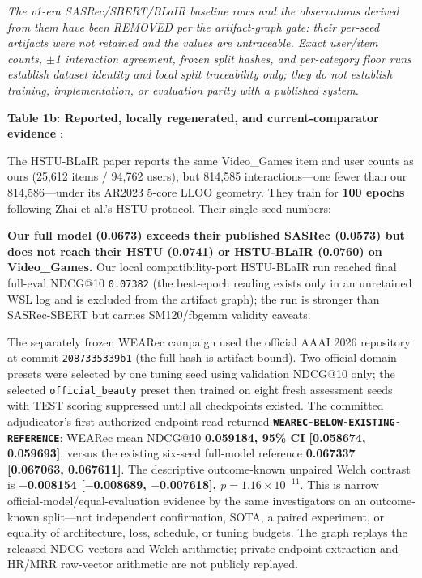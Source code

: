 

\emph{The v1-era SASRec/SBERT/BLaIR baseline rows and the observations derived from them have been REMOVED per the artifact-graph gate: their per-seed artifacts were not retained and the values are untraceable. Exact user/item counts, \ensuremath{\pm}1 interaction agreement, frozen split hashes, and per-category floor runs establish dataset identity and local split traceability only; they do not establish training, implementation, or evaluation parity with a published system.}

\fi

\textbf{Table 1b: Reported, locally regenerated, and current-comparator evidence} \citep{liu2025hstublair,hu2025alphafuse,xu2026wearec}:

The HSTU-BLaIR paper reports the same Video\_Games item and user counts as ours (25,612 items / 94,762 users), but 814,585 interactions---one fewer than our 814,586---under its AR2023 5-core LLOO geometry. They train for \textbf{100 epochs} following Zhai et al.'s HSTU protocol. Their single-seed numbers:



\textbf{Our full model (0.0673) exceeds their published SASRec (0.0573) but does not reach their HSTU (0.0741) or HSTU-BLaIR (0.0760) on Video\_Games.} Our local compatibility-port HSTU-BLaIR run reached final full-eval NDCG@10 \texttt{0.07382} (the best-epoch reading exists only in an unretained WSL log and is excluded from the artifact graph); the run is stronger than SASRec-SBERT but carries SM120/fbgemm validity caveats.

The separately frozen WEARec campaign used the official AAAI 2026 repository at commit \texttt{2087335339b1} (the full hash is artifact-bound). Two official-domain presets were selected by one tuning seed using validation NDCG@10 only; the selected \texttt{official\_beauty} preset then trained on eight fresh assessment seeds with TEST scoring suppressed until all checkpoints existed. The committed adjudicator's first authorized endpoint read returned \textbf{\texttt{WEAREC-BELOW-\allowbreak EXISTING-REFERENCE}}: WEARec mean NDCG@10 \textbf{0.059184, 95\% CI [0.058674, 0.059693]}, versus the existing six-seed full-model reference \textbf{0.067337 [0.067063, 0.067611]}. The descriptive outcome-known unpaired Welch contrast is \textbf{\ensuremath{-}0.008154 [\ensuremath{-}0.008689, \ensuremath{-}0.007618], \ensuremath{p=1.16\times10^{-11}}}. This is narrow official-model/equal-evaluation evidence by the same investigators on an outcome-known split---not independent confirmation, SOTA, a paired experiment, or equality of architecture, loss, schedule, or tuning budgets. The graph replays the released NDCG vectors and Welch arithmetic; private endpoint extraction and HR/MRR raw-vector arithmetic are not publicly replayed.

